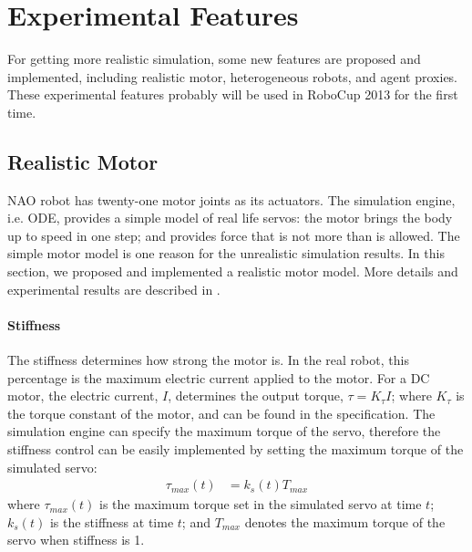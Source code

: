 \documentclass{llncs}
\begin{document}
\section{Experimental Features}
\label{s:ongoing}

For getting more realistic simulation, some new features are proposed and implemented, including realistic motor, heterogeneous robots, and agent proxies.
These experimental features probably will be used in RoboCup 2013 for the first time.

\subsection{Realistic Motor}
NAO robot has twenty-one motor joints as its actuators.
The simulation engine, i.e. ODE, provides a simple model of real life servos:
the motor brings the body up to speed in one step; and provides force that is not more than is allowed.
The simple motor model is one reason for the unrealistic simulation results.
In this section, we proposed and implemented a realistic motor model. More details and experimental results are described in \cite{Xu2012}.

\paragraph{Stiffness}
The stiffness determines how strong the motor is.
In the real robot, this percentage is the maximum electric current applied to the motor.
For a DC motor, the electric current, $I$, determines the output torque,
$\tau = K_\tau I \label{eq:tau-i}$;
where $K_\tau$ is the torque constant of the motor, and can be found in the
specification.
The simulation engine can specify the maximum torque of the servo, therefore the
stiffness control can be easily implemented by setting the maximum torque
of the simulated servo:
\begin{align}
  \tau_{max}(t) &= k_{s}(t) T_{max}
\end{align}
where $\tau_{max}(t)$ is the maximum torque set in the simulated servo at
time $t$; $k_{s}(t)$ is the stiffness at time $t$; and $T_{max}$
denotes the maximum torque of the servo when stiffness is 1.
\end{document}
